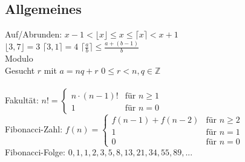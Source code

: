 \documentclass[fs, footer]{latex4ei}
\begin{document}
\begin{multicols*}{4}
\subsection{Allgemeines}
Auf/Abrunden: $x-1 < \lfloor x \rfloor \le x \le \lceil x \rceil < x+1$\\
$\lfloor 3,7 \rfloor = 3$ \qquad $\lceil 3,1 \rceil = 4$ \qquad $\lceil \frac{a}{b} \rceil \le \frac{a+(b-1)}{b}$\\[0.5em]
Modulo \\
Gesucht $r$ mit $a = nq +r$ \qquad $0 \le r < n, q \in \mathbb Z$\\
\\
Fakultät: $n! = \begin{cases} n \cdot (n-1)! & \text{für } n \ge 1 \\ 1  & \text{für } n = 0 \end{cases}$\\
Fibonacci-Zahl: $f(n) = \begin{cases} f(n-1) + f(n-2) & \text{für } n\ge 2\\ 1 & \text{für } n = 1 \\ 0 & \text{für } n = 0 \end{cases}$\\
Fibonacci-Folge: $0,1,1,2,3,5,8,13,21,34,55,89,...$\\

\end{multicols*}
\end{document}
